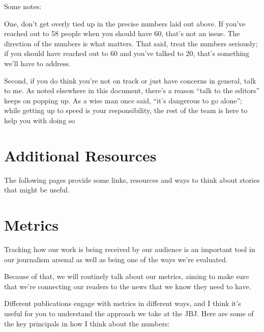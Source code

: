 \documentclass[
  11pt,
  american,
  letterpaperpaper,
  extrafontsizes,onecolumn,openright
  ]{memoir}
\begin{document}
Some notes:

One, don't get overly tied up in the precise numbers laid out above. If you've reached out to 58 people when you should have 60, that's not an issue. The direction of the numbers is what matters. That said, treat the numbers seriously; if you should have reached out to 60 and you've talked to 20, that's something we'll have to address.

Second, if you do think you're not on track or just have concerns in general, talk to me. As noted elsewhere in this document, there's a reason \enquote{talk to the editors} keeps on popping up. As a wise man once said, \enquote{it's dangerous to go alone}; while getting up to speed is your responsibility, the rest of the team is here to help you with doing so

\hypertarget{additional-resources}{%
\chapter*{Additional Resources}\label{additional-resources}}

The following pages provide some links, resources and ways to think about stories that might be useful.

\hypertarget{appendix-appendix}{%
\appendix}


\hypertarget{metrics}{%
\chapter{Metrics}\label{metrics}}

Tracking how our work is being received by our audience is an important tool in our journalism arsenal as well as being one of the ways we're evaluated.

Because of that, we will routinely talk about our metrics, aiming to make sure that we're connecting our readers to the news that we know they need to have.

Different publications engage with metrics in different ways, and I think it's useful for you to understand the approach we take at the JBJ. Here are some of the key principals in how I think about the numbers:
\end{document}

